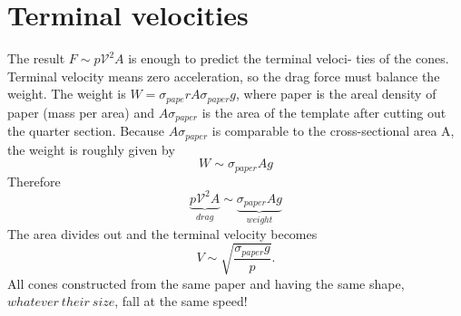 \documentclass[a4paper, 12pt]{book}
\begin{document}
\section{Terminal velocities}
The result $F\sim p\mathcal{V}^2A$ is enough to predict the terminal veloci- ties of the cones. Terminal velocity means zero acceleration, so the drag force must balance the weight. The weight is $W = \sigma_{pape}rA\sigma_{paper}g$, where paper is the areal density of paper (mass per area) and $A\sigma_{paper}$ is the area of the template after cutting out the quarter section. Because $A\sigma_{paper}$ is comparable to the cross-sectional area A, the weight is roughly given by
\begin{equation}W\sim \sigma_{paper} Ag\end{equation} 
Therefore
\begin{equation} \underbrace{p\mathcal{V}^2 A }_{drag}\sim \underbrace{\sigma_{paper} Ag }_{weight}\end{equation}
The area divides out and the terminal velocity becomes
\begin{equation}
V \sim \sqrt {\frac{\sigma_{paper} g}{p}}.
\end{equation}
All cones constructed from the same paper and having the same shape, $whatever\ their\ size$, fall at the same speed!
\end{document}
